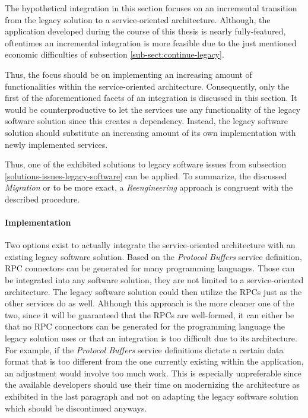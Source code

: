 \documentclass[12pt,a4paper,twoside]{report}
\begin{document}
The hypothetical integration in this section focuses on an incremental transition
from the legacy solution to a service-oriented architecture.
Although, the application developed during the course of this thesis is nearly
fully-featured, oftentimes an incremental integration is more feasible due to
the just mentioned economic difficulties of subsection \ref{sub-sect:continue-legacy}.

Thus, the focus should be on implementing an increasing amount of functionalities
within the service-oriented architecture. Consequently, only the first of the
aforementioned facets of an integration is discussed in this section.
It would be counterproductive to let the services use any functionality of the
legacy software solution since this creates a dependency.
Instead, the legacy software solution should substitute an increasing amount
of its own implementation with newly implemented services.

Thus, one of the exhibited solutions to legacy software issues from subsection
\ref{solutions-issues-legacy-software} can be applied.
To summarize, the discussed \textit{Migration} or to be more exact,
a \textit{Reengineering} approach is congruent with the described procedure.

\paragraph{Implementation}
Two options exist to actually integrate the service-oriented architecture
with an existing legacy software solution.
Based on the \textit{Protocol Buffers} service definition, RPC connectors can
be generated for many programming languages. Those can be integrated into any
software solution, they are not limited to a service-oriented architecture.
The legacy software solution could then utilize the RPCs just as the other
services do as well. Although this approach is the more cleaner one of the two,
since it will be guaranteed that the RPCs are well-formed, it can either be
that no RPC connectors can be generated for the programming language the
legacy solution uses or that an integration is too difficult due to its
architecture. For example, if the \textit{Protocol Buffers} service definitions
dictate a certain data format that is too different from the one currently
existing within the application, an adjustment would involve too much work.
This is especially unpreferable since the available developers should use their
time on modernizing the architecture as exhibited in the last paragraph and
not on adapting the legacy software solution which should be discontinued anyways.
\end{document}
